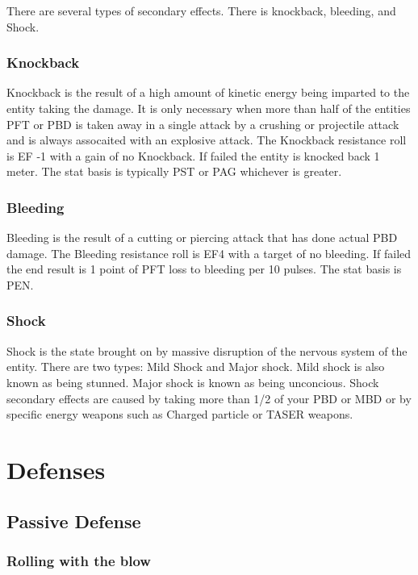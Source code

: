 There are several types of secondary effects. There is knockback, 
bleeding, and Shock.

\subsubsection{Knockback}

Knockback is the result of a high amount of kinetic energy being 
imparted to the entity taking the damage. It is only necessary when 
more than half of the entities PFT or PBD is taken away in a single 
attack by a crushing or projectile attack and is always assocaited 
with an explosive attack. The Knockback resistance roll is EF -1 with a
gain of no Knockback. If failed the entity is knocked back 1 meter. 
The stat basis is typically PST or PAG whichever is greater.

\subsubsection{Bleeding}

Bleeding is the result of a cutting or piercing attack that has done 
actual PBD damage. The Bleeding resistance roll is EF4 with a target 
of no bleeding. If failed the end result is 1 point of PFT loss to 
bleeding per 10 pulses. The stat basis is PEN. 

\subsubsection{Shock}

Shock is the state brought on by massive disruption of the nervous 
system of the entity. There are two types: Mild Shock and Major 
shock. Mild shock is also known as being stunned. Major shock is 
known as being unconcious. Shock secondary effects are caused by 
taking more than 1/2 of your PBD or MBD or by specific energy weapons 
such as Charged particle or TASER weapons. 

\section{Defenses}

\subsection{Passive Defense}

\subsubsection{Rolling with the blow}

